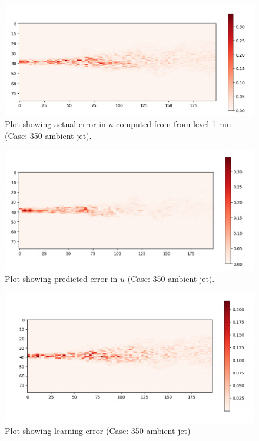 \documentclass{article}
\begin{document}
\begin{figure}[h!]
    \centering
    \includegraphics[width = 0.8\linewidth]{figures/314_350_01_actual.png}
    \caption{Plot showing actual error in $u$ computed from from level 1 run (Case: 350 ambient jet).}
    \label{amr_err}
\end{figure}

\begin{figure}[h!]
    \centering
    \includegraphics[width = 0.8\linewidth]{figures/314_350_01_pred.png}
    \caption{Plot showing predicted error in $u$ (Case: 350 ambient jet).}
    \label{amr_err}
\end{figure}

\begin{figure}[h!]
    \centering
    \includegraphics[width = 0.8\linewidth]{figures/314_350_01_error.png}
    \caption{Plot showing learning error (Case: 350 ambient jet)}
    \label{amr_err}
\end{figure}
\end{document}
